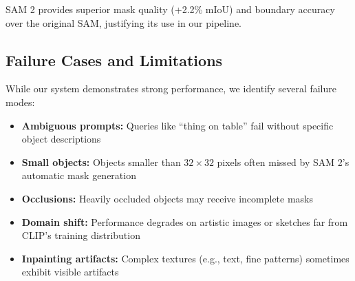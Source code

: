 SAM 2 provides superior mask quality (+2.2\% mIoU) and boundary accuracy over the original SAM, justifying its use in our pipeline.

\subsection{Failure Cases and Limitations}

While our system demonstrates strong performance, we identify several failure modes:

\begin{itemize}
    \item \textbf{Ambiguous prompts:} Queries like ``thing on table'' fail without specific object descriptions
    \item \textbf{Small objects:} Objects smaller than $32 \times 32$ pixels often missed by SAM 2's automatic mask generation
    \item \textbf{Occlusions:} Heavily occluded objects may receive incomplete masks
    \item \textbf{Domain shift:} Performance degrades on artistic images or sketches far from CLIP's training distribution
    \item \textbf{Inpainting artifacts:} Complex textures (e.g., text, fine patterns) sometimes exhibit visible artifacts
\end{itemize}

